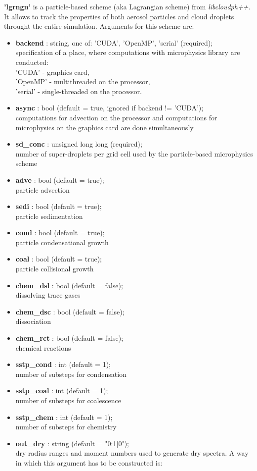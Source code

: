 \documentclass[11pt]{article}
\begin{document}
\begin{itemize}
\textbf{'lgrngn'} is a particle-based scheme (aka Lagrangian scheme) from \textit{libcloudph++}. It allows to track the properties of both aerosol particles and cloud droplets throught the entire simulation. Arguments for this scheme are:
\begin{itemize}[label=$\bullet$]
\item \textbf{backend} : string, one of: 'CUDA', 'OpenMP', 'serial' (required); \\ specification of a place, where computations with microphysics library are conducted: \\'CUDA' - graphics card, \\'OpenMP' - multithreaded on the processor, \\ 'serial' - single-threaded on the processor. 
\item \textbf{async} : bool (default = true, ignored if backend != 'CUDA'); \\ computations for advection on the processor and computations for microphysics on the graphics card are done simultaneously
\item \textbf{sd\_conc} : unsigned long long (required); \\ number of super-droplets per grid cell used by the particle-based microphysics scheme
\item \textbf{adve} : bool (default = true); \\
particle advection
\item \textbf{sedi} : bool (default = true);\\
particle sedimentation
\item \textbf{cond} : bool (default = true);\\
particle condensational growth
\item \textbf{coal} : bool (default = true);\\
particle collisional growth
\item \textbf{chem\_dsl} : bool (default = false);\\
dissolving trace gases
\item \textbf{chem\_dsc} : bool (default = false);\\
dissociation
\item \textbf{chem\_rct} : bool (default = false);\\
chemical reactions
\item \textbf{sstp\_cond} : int (default = 1);\\
number of substeps for condensation
\item \textbf{sstp\_coal} : int (default = 1); \\
number of substeps for coalescence
\item \textbf{sstp\_chem} : int (default = 1); \\
number of substeps for chemistry
\item \textbf{out\_dry} : string (default = "0:1$|$0");\\
dry radius ranges and moment numbers used to generate dry spectra. A way in which this argument has to be constructed is:\\


\end{itemize}
\end{itemize}
\end{document}

